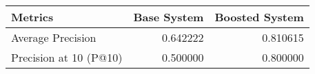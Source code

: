 \begin{tabular}{lrr}
\toprule
               Metrics &  Base System &  Boosted System \\
\midrule
     Average Precision &     0.642222 &        0.810615 \\
Precision at 10 (P@10) &     0.500000 &        0.800000 \\
\bottomrule
\end{tabular}

